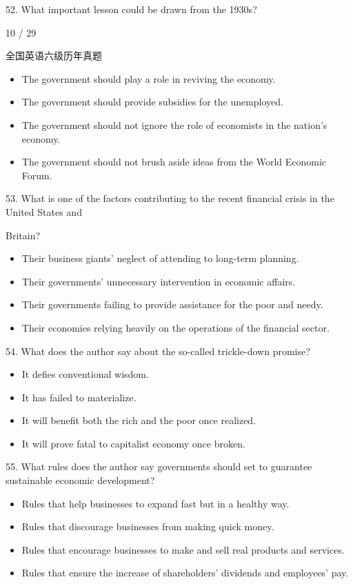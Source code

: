 \documentclass[UTF8,11pt]{ctexart}
\begin{document}
52. What important lesson could be drawn from the 1930s?


10 / 29


全国英语六级历年真题


\begin{itemize}[leftmargin=2em,itemsep=.2em,topsep=.4em]\item[A.] The government should play a role in reviving the economy.
\item[B.] The government should provide subsidies for the unemployed.
\item[C.] The government should not ignore the role of economists in the nation's economy.
\item[D.] The government should not brush aside ideas from the World Economic Forum.
\end{itemize}

53. What is one of the factors contributing to the recent financial crisis in the United States and


Britain?


\begin{itemize}[leftmargin=2em,itemsep=.2em,topsep=.4em]\item[A.] Their business giants' neglect of attending to long-term planning.
\item[B.] Their governments' unnecessary intervention in economic affairs.
\item[C.] Their governments failing to provide assistance for the poor and needy.
\item[D.] Their economies relying heavily on the operations of the financial sector.
\end{itemize}

54. What does the author say about the so-called trickle-down promise?


\begin{itemize}[leftmargin=2em,itemsep=.2em,topsep=.4em]\item[A.] It defies conventional wisdom.
\item[B.] It has failed to materialize.
\item[C.] It will benefit both the rich and the poor once realized.
\item[D.] It will prove fatal to capitalist economy once broken.
\end{itemize}

55. What rules does the author say governments should set to guarantee sustainable economic development?


\begin{itemize}[leftmargin=2em,itemsep=.2em,topsep=.4em]\item[A.] Rules that help businesses to expand fast but in a healthy way.
\item[B.] Rules that discourage businesses from making quick money.
\item[C.] Rules that encourage businesses to make and sell real products and services.
\item[D.] Rules that ensure the increase of shareholders' dividends and employees' pay.
\end{itemize}
\end{document}
